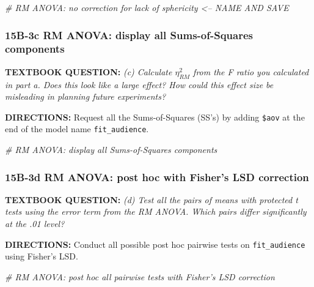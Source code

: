 \documentclass[
]{article}
\newenvironment{Shaded}{\begin{snugshade}}{\end{snugshade}}
\newcommand{\CommentTok}[1]{\textcolor[rgb]{0.56,0.35,0.01}{\textit{#1}}}
\begin{document}
\begin{Shaded}
\begin{Highlighting}[]
\CommentTok{# RM ANOVA: no correction for lack of sphericity  <-- NAME AND SAVE}
\end{Highlighting}
\end{Shaded}

\clearpage

\hypertarget{b-3c-rm-anova-display-all-sums-of-squares-components}{%
\subsubsection{15B-3c RM ANOVA: display all Sums-of-Squares
components}\label{b-3c-rm-anova-display-all-sums-of-squares-components}}

\textbf{TEXTBOOK QUESTION:} \emph{(c) Calculate \(\eta_{RM}^2\) from the
F ratio you calculated in part a. Does this look like a large effect?
How could this effect size be misleading in planning future
experiments?}

\textbf{DIRECTIONS:} Request all the Sums-of-Squares (SS's) by adding
\texttt{\$aov} at the end of the model name \texttt{fit\_audience}.

\begin{Shaded}
\begin{Highlighting}[]
\CommentTok{# RM ANOVA: display all Sums-of-Squares components}
\end{Highlighting}
\end{Shaded}

\clearpage

\hypertarget{b-3d-rm-anova-post-hoc-with-fishers-lsd-correction}{%
\subsubsection{15B-3d RM ANOVA: post hoc with Fisher's LSD
correction}\label{b-3d-rm-anova-post-hoc-with-fishers-lsd-correction}}

\textbf{TEXTBOOK QUESTION:} \emph{(d) Test all the pairs of means with
protected t tests using the error term from the RM ANOVA. Which pairs
differ significantly at the .01 level?}

\textbf{DIRECTIONS:} Conduct all possible post hoc pairwise tests on
\texttt{fit\_audience} using Fisher's LSD.

\begin{Shaded}
\begin{Highlighting}[]
\CommentTok{# RM ANOVA: post hoc all pairwise tests with Fisher's LSD correction}
\end{Highlighting}
\end{Shaded}
\end{document}
